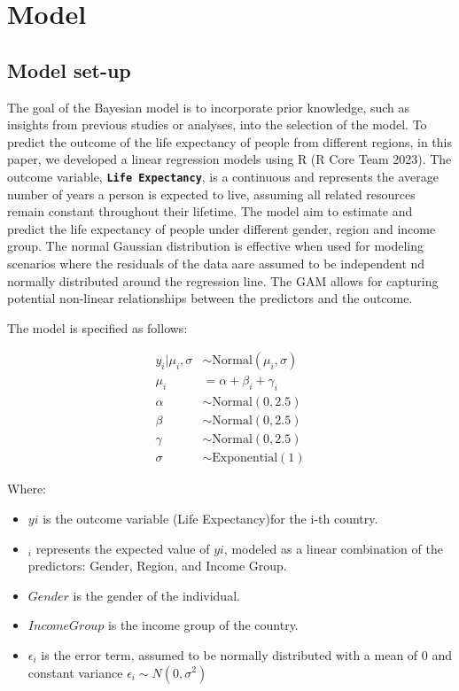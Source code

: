 \documentclass[
  letterpaper,
  DIV=11,
  numbers=noendperiod]{scrartcl}
\begin{document}
\section{Model}\label{model}

\subsection{Model set-up}\label{sec-modset}

The goal of the Bayesian model is to incorporate prior knowledge, such
as insights from previous studies or analyses, into the selection of the
model. To predict the outcome of the life expectancy of people from
different regions, in this paper, we developed a linear regression
models using R (R Core Team 2023). The outcome variable,
\textbf{\texttt{Life\ Expectancy}}, is a continuous and represents the
average number of years a person is expected to live, assuming all
related resources remain constant throughout their lifetime. The model
aim to estimate and predict the life expectancy of people under
different gender, region and income group. The normal Gaussian
distribution is effective when used for modeling scenarios where the
residuals of the data aare assumed to be independent nd normally
distributed around the regression line. The GAM allows for capturing
potential non-linear relationships between the predictors and the
outcome.

The model is specified as follows:

\begin{align} 
y_i|\mu_i, \sigma &\sim \mbox{Normal}(\mu_i, \sigma) \\
\mu_i &= \alpha + \beta_i + \gamma_i\\
\alpha &\sim \mbox{Normal}(0, 2.5) \\
\beta &\sim \mbox{Normal}(0, 2.5) \\
\gamma &\sim \mbox{Normal}(0, 2.5) \\
\sigma &\sim \mbox{Exponential}(1)
\end{align}

Where:

\begin{itemize}
\item
  \(yi\) is the outcome variable (Life Expectancy)for the i-th country.
\item
  \(_i\) represents the expected value of \(yi\), modeled as a linear
  combination of the predictors: Gender, Region, and Income Group.
\item
  \(Gender\) is the gender of the individual.
\item
  \(Income Group\) is the income group of the country.
\item
  \(\epsilon_i\) is the error term, assumed to be normally distributed
  with a mean of 0 and constant variance \(ϵ_i​∼N(0,\sigma^2)\)
\end{itemize}
\end{document}
